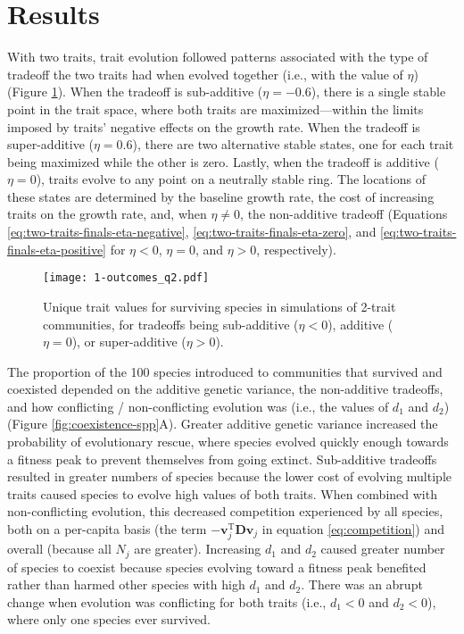 \section*{Results}


With two traits, trait evolution followed patterns associated with the type 
of tradeoff the two traits had when evolved together
(i.e., with the value of $\eta$)
(Figure \ref{fig:two-trait-outcomes}).
When the tradeoff is sub-additive ($\eta = -0.6$), there is a single
stable point in the trait space, where both traits are
maximized---within the limits imposed by traits' negative effects on 
the growth rate.
When the tradeoff is super-additive ($\eta = 0.6$), there are two
alternative stable states, one for each trait being maximized while the 
other is zero.
Lastly, when the tradeoff is additive ($\eta = 0$), traits
evolve to any point on a neutrally stable ring.
The locations of these states are determined by 
the baseline growth rate, 
the cost of increasing traits on the growth rate,
and, when $\eta \ne 0$, the non-additive tradeoff
(Equations \ref{eq:two-traits-finals-eta-negative},
\ref{eq:two-traits-finals-eta-zero}, and 
\ref{eq:two-traits-finals-eta-positive} for 
$\eta < 0$, $\eta = 0$, and $\eta > 0$, respectively).

\begin{figure}[ht!]
\centering
\texttt{[image: 1-outcomes\_q2.pdf]}
\caption{Unique trait values for surviving species in simulations of 2-trait communities,
    for tradeoffs being sub-additive ($\eta < 0$), additive ($\eta = 0$), or 
    super-additive ($\eta > 0$).}
\label{fig:two-trait-outcomes}
\end{figure}




The proportion of the 100 species introduced to communities that survived and
coexisted depended on the additive genetic variance, 
the non-additive tradeoffs, and 
how conflicting / non-conflicting evolution was (i.e., the values of $d_1$ 
and $d_2$) (Figure \ref{fig:coexistence-spp}A).
Greater additive genetic variance increased the probability of evolutionary 
rescue, where species evolved quickly enough towards a fitness peak to
prevent themselves from going extinct.
Sub-additive tradeoffs resulted in greater numbers of species because
the lower cost of evolving multiple traits caused species to evolve
high values of both traits.
When combined with non-conflicting evolution,
this decreased competition experienced by all species, both on a 
per-capita basis (the term $- \mathbf{v}_{j}^{\text{T}} \mathbf{D} \mathbf{v}_j$ 
in equation \ref{eq:competition})
and overall (because all $N_j$ are greater).
Increasing $d_1$ and $d_2$ caused greater number of species to coexist
because species evolving toward a fitness peak benefited rather than 
harmed other species with high $d_1$ and $d_2$.
There was an abrupt change when evolution was conflicting for both traits 
(i.e., $d_1 < 0$ and $d_2 < 0$),
where only one species ever survived.

